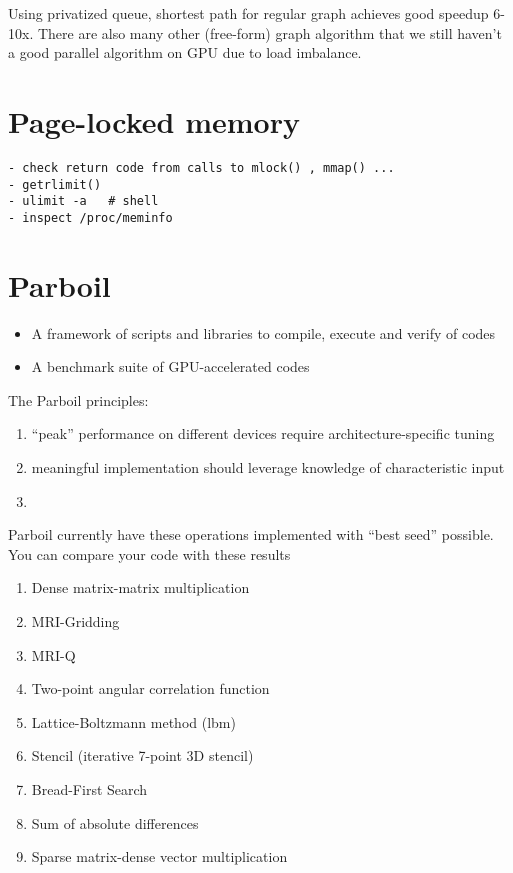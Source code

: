 Using privatized queue, shortest path for regular graph achieves good
speedup 6-10x.  There are also many other (free-form) graph algorithm
that we still haven't a good parallel algorithm on GPU due to load
imbalance.



\section{Page-locked memory}
\label{sec:page-locked-memory}

\begin{verbatim}
- check return code from calls to mlock() , mmap() ...
- getrlimit() 
- ulimit -a   # shell
- inspect /proc/meminfo
\end{verbatim}


\section{Parboil}
\label{sec:parboil}

\begin{itemize}
\item A framework of scripts and libraries to compile, execute and
  verify of codes

\item A benchmark suite of GPU-accelerated codes
\end{itemize}

The Parboil principles:
\begin{enumerate}
\item ``peak'' performance on different devices require
  architecture-specific tuning
\item meaningful implementation should leverage knowledge of
  characteristic input
\item 
\end{enumerate}

Parboil currently have these operations implemented with ``best seed''
possible. You can compare your code with these results
\begin{enumerate}
\item Dense matrix-matrix multiplication
\item MRI-Gridding
\item MRI-Q
\item Two-point angular correlation function
\item Lattice-Boltzmann method (lbm)
\item Stencil (iterative 7-point 3D stencil)
\item Bread-First Search
\item Sum of absolute differences
\item Sparse matrix-dense vector multiplication
\end{enumerate}

